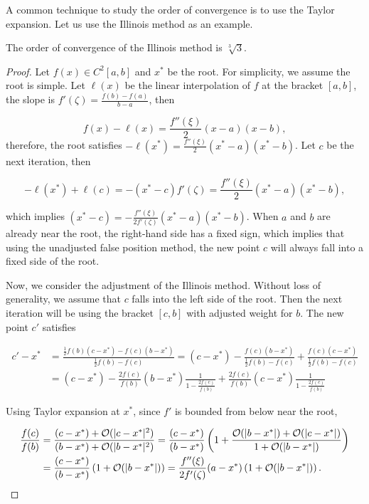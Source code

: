A common technique to study the order of convergence is to use the Taylor expansion. Let us use the Illinois method as an example.

\begin{theorem}
\label{THM: 0-IL-ME}
    The order of convergence of the Illinois method is $\sqrt[3]{3}$.
\end{theorem}

\begin{proof}
Let $f(x)\in C^2[a, b]$ and $x^{\ast}$ be the root. For simplicity, we assume the root is simple. Let $\ell(x)$ be the linear interpolation of $f$ at the bracket $[a, b]$, the slope is $f'(\zeta)=\frac{f(b) - f(a)}{b -a}$, then 

$$
f(x) - \ell(x) = \frac{f''(\xi)}{2}(x - a)(x - b),
$$
therefore, the root satisfies $-\ell(x^{\ast}) = \frac{f''(\xi)}{2}(x^{\ast} - a)(x^{\ast} - b)$. Let $c$ be the next iteration, then 

$$
-\ell(x^{\ast}) + \ell(c) = -(x^{\ast} - c) f'(\zeta) =  \frac{f''(\xi)}{2}(x^{\ast} - a)(x^{\ast} - b),
$$

which implies $(x^{\ast} - c) = -\frac{f''(\xi)}{2 f'(\zeta)} (x^{\ast} - a)(x^{\ast} - b)$. When $a$ and $b$ are already near the root, the right-hand side has a fixed sign, which implies that using the unadjusted false position method, the new point $c$ will always fall into a fixed side of the root.

Now, we consider the adjustment of the Illinois method. Without loss of generality, we assume that $c$ falls into the left side of the root. Then the next iteration will be using the bracket $[c, b]$ with adjusted weight for $b$. The new point $c'$ satisfies 

$$
\begin{aligned}
c' - x^{\ast} &= \frac{\frac{1}{2} f(b) (c - x^{\ast}) - f(c) (b - x^{\ast})}{\frac{1}{2} f(b) - f(c)}  = (c - x^{\ast}) - \frac{f(c)(b-x^{\ast})}{\frac{1}{2}f(b) - f(c)}
+ \frac{f(c)(c - x^{\ast})}{\frac{1}{2}f(b) - f(c)}\\
&= (c - x^{\ast}) - \frac{2f(c)}{f(b)}(b - x^{\ast}) \frac{1}{1 - \frac{2f(c)}{f(b)}} + \frac{2f(c)}{f(b)}(c - x^{\ast}) \frac{1}{1 - \frac{2f(c)}{f(b)}}
\end{aligned}
$$

Using Taylor expansion at $x^{\ast}$, since $f'$ is bounded from below near the root, 

 $$
 \begin{aligned}
 \frac{f(c)}{f(b)} &= \frac{(c - x^{\ast}) + \mathcal O(|c - x^{\ast}|^2)}{(b - x^{\ast}) + \mathcal O(|b - x^{\ast}|^2)} = \frac{(c - x^{\ast})}{(b - x^{\ast})}\left(1 + \frac{\mathcal O(|b-x^{\ast}|) + \mathcal O(|c - x^{\ast}|)}{1 + \mathcal O(|b-x^{\ast}|)}\right) \\&= \frac{(c - x^{\ast})}{(b - x^{\ast})}\left(1 + \mathcal O(|b-x^{\ast}|)\right) = \frac{f''(\xi)}{2 f'(\zeta)} (a - x^{\ast}) \left(1 + \mathcal O(|b-x^{\ast}|)\right)  .
 \end{aligned}
 $$ 


\end{proof}
